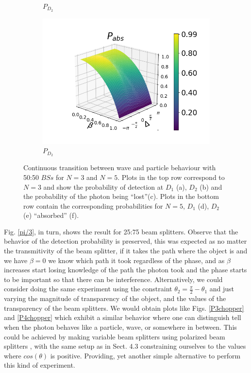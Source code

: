 \documentclass[12pt]{book}
\begin{document}
\begin{figure}[t!]
\begin{subfigure}[b]{0.3\linewidth}
\caption{$P_{D_{2}}$ }
\label{fig:BS1}
\end{subfigure}
\begin{subfigure}[b]{0.3\linewidth}
\includegraphics[width=\linewidth]{images/pabs_5_pi4.png}
\caption{$P_{D_{2}}$ }
\label{fig:BS1}
\end{subfigure}
\caption{Continuous transition between wave and particle behaviour with 50:50 $BSs$ for $N=3$ and $N=5$. Plots in the top row correspond to $N=3$ and show the probability of detection at $D_{1}$ (a), $D_{2}$ (b) and the probability of the photon being ``lost''(c). Plots in the bottom row contain the corresponding probabilities for $N=5$,  $D_{1}$ (d),  $D_{2}$ (e)  ``absorbed'' (f).}
\label{varias}
\end{figure}

Fig. \ref{pi/3}, in turn, shows the result for 25:75 beam splitters. Observe that the behavior of the detection probability is preserved, this was expected as no matter the transmitivity of the beam splitter, if it takes the path where the object is and we have $\beta=0$ we know which path it took regardless of the phase, and as $\beta$ increases start losing knowledge of the path the photon took and the phase starts to be important so that there can be interference. Alternatively, we could consider doing the same experiment using the constraint $\theta_{2}=\frac{\pi}{2}-\theta_{1}$ and just varying the magnitude of transparency of the object, and the values of the transparency of the beam splitters. We would obtain plots like Figs. \ref{P3chopper} and \ref{P4chopper} which exhibit a similar behavior where one can distinguish tell when the photon behaves like a particle, wave, or somewhere in between. This could be achieved by making variable beam splitters using polarized beam splitters \cite{variable}, with the same setup as in Sect. 4.3 constraining ourselves to the values where $cos(\theta)$ is positive. Providing, yet another simple alternative to perform this kind of experiment.
\end{document}
